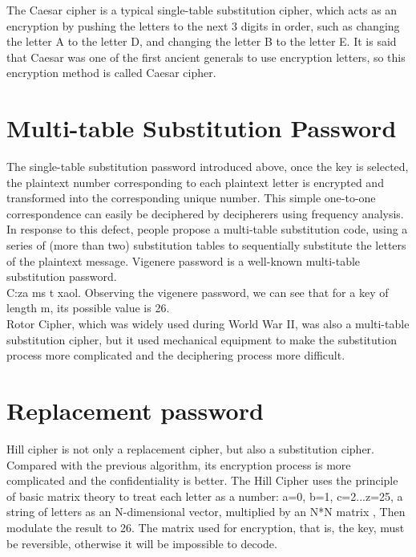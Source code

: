 \documentclass{article}
\begin{document}
The Caesar cipher is a typical single-table substitution cipher, which acts as an encryption by pushing the letters to the next 3 digits in order, such as changing the letter A to the letter D, and changing the letter B to the letter E. It is said that Caesar was one of the first ancient generals to use encryption letters, so this encryption method is called Caesar cipher.


\section{Multi-table Substitution Password}


The single-table substitution password introduced above, once the key is selected, the plaintext number corresponding to each plaintext letter is encrypted and transformed into the corresponding unique number. This simple one-to-one correspondence can easily be deciphered by decipherers using frequency analysis. In response to this defect, people propose a multi-table substitution code, using a series of (more than two) substitution tables to sequentially substitute the letters of the plaintext message. Vigenere password is a well-known multi-table substitution password.\\

C:za ms t xaol. Observing the vigenere password, we can see that for a key of length m, its possible value is 26.\\

Rotor Cipher, which was widely used during World War II, was also a multi-table substitution cipher, but it used mechanical equipment to make the substitution process more complicated and the deciphering process more difficult.\\


\section{Replacement password}


Hill cipher is not only a replacement cipher, but also a substitution cipher. Compared with the previous algorithm, its encryption process is more complicated and the confidentiality is better. The Hill Cipher uses the principle of basic matrix theory to treat each letter as a number: a=0, b=1, c=2...z=25, a string of letters as an N-dimensional vector, multiplied by an N*N matrix , Then modulate the result to 26. The matrix used for encryption, that is, the key, must be reversible, otherwise it will be impossible to decode.\\
\end{document}
